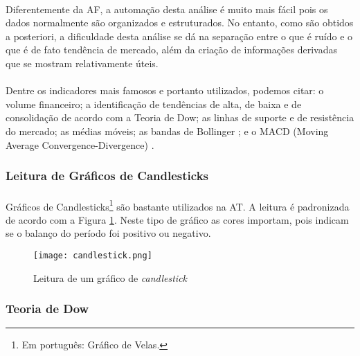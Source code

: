\paragraph{} Diferentemente da AF, a automação desta análise é muito mais fácil pois os dados normalmente são organizados e estruturados. No entanto, como são obtidos a posteriori, a dificuldade desta análise se dá na separação entre o que é ruído e o que é de fato tendência de mercado, além da criação de informações derivadas que se mostram relativamente úteis.

\paragraph{} Dentre os indicadores mais famosos e portanto utilizados, podemos citar: o volume financeiro; a identificação de tendências de alta, de baixa e de consolidação de acordo com a Teoria de Dow; as linhas de suporte e de resistência do mercado; as médias móveis; as bandas de Bollinger \cite{bollinger2002bollinger}; e o MACD (Moving Average Convergence-Divergence) \cite{appel2007understanding}.

\subsubsection*{Leitura de Gráficos de Candlesticks}

\paragraph{} Gráficos de Candlesticks\footnote{Em português: Gráfico de Velas.} são bastante utilizados na AT. A leitura é padronizada de acordo com a Figura \ref{fig:1}. Neste tipo de gráfico as cores importam, pois indicam se o balanço do período foi positivo ou negativo.

\begin{figure}[h]
    \texttt{[image: candlestick.png]}
    \centering
    \caption{Leitura de um gráfico de \textit{candlestick} \cite{candlestick}}
    \label{fig:1}
\end{figure}

\subsubsection*{Teoria de Dow}

